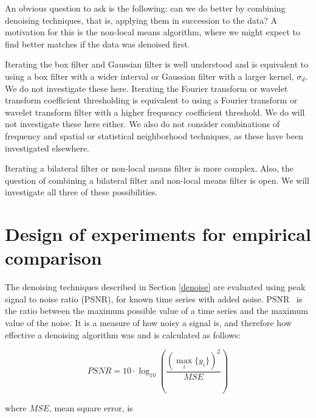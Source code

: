\documentclass[11pt]{article}
\theoremstyle{definition}
\begin{document}
An obvious question to ask is the following: can we do better by
combining denoising techniques, that is, applying them in succession
to the data? A motivation for this is the non-local means algorithm,
where we might expect to find better matches if the data was denoised
first.

Iterating the box filter and Gaussian filter is well understood
and is equivalent to using a box filter with a
wider interval or Gaussian filter with a larger kernel, $\sigma_d$. We do not investigate
these here. Iterating the Fourier transform or wavelet transform
coefficient thresholding is equivalent to using a Fourier transform or
wavelet transform filter with a higher frequency coefficient
threshold. We do will not investigate these here either. We also do
not consider combinations of frequency and spatial or statistical
neighborhood techniques, as these have been investigated elsewhere.

Iterating a bilateral filter or non-local means filter is more
complex. Also, the question of combining a bilateral filter and
non-local means filter is open. We will investigate all three of these
possibilities.

\section{Design of experiments for empirical comparison}
\label{design}

The denoising techniques described in Section \ref{denoise} are
evaluated using peak signal to noise ratio (PSNR), for known time
series with added noise. 
%
%
PSNR~\cite{Thu08} is the ratio between the maximum possible value of a time series and the maximum value of the noise. It is a measure of how noisy a signal
is, and therefore how effective a denoising algorithm was and is calculated as follows:

\begin{displaymath}
PSNR = 10 \cdot \log _{10} \left( \frac{ \left(\max\limits_{i} \{y_i\} \right)^2}{MSE} \right)
\end{displaymath}

\noindent
where $MSE$, mean square error, is
\end{document}
